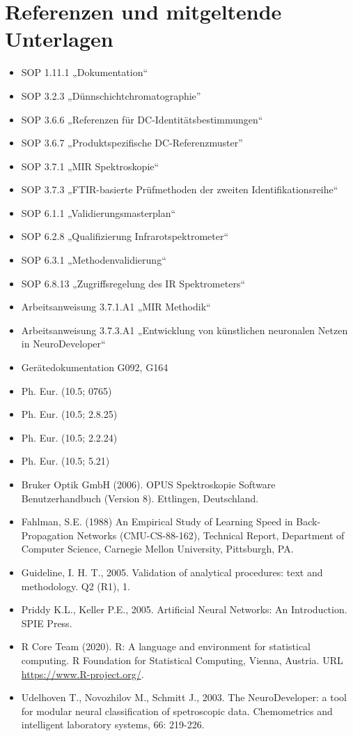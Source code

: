 \documentclass[11pt, a4paper]{article}
\newcommand\VersionPhEur{10.5}
\begin{document}
\section{Referenzen und mitgeltende Unterlagen}
\begin{itemize}
\item SOP 1.11.1 „Dokumentation“
\item SOP 3.2.3 „Dünnschichtchromatographie”
\item SOP 3.6.6 „Referenzen für DC-Identitätsbestimmungen“
\item SOP 3.6.7 „Produktspezifische DC-Referenzmuster”
\item SOP 3.7.1 „MIR Spektroskopie“
\item SOP 3.7.3 „FTIR-basierte Prüfmethoden der zweiten Identifikationsreihe“
\item SOP 6.1.1 „Validierungsmasterplan“
\item SOP 6.2.8 „Qualifizierung Infrarotspektrometer“
\item SOP 6.3.1 „Methodenvalidierung“
\item SOP 6.8.13 „Zugriffsregelung des IR Spektrometers“
\item Arbeitsanweisung 3.7.1.A1 „MIR Methodik“
\item Arbeitsanweisung 3.7.3.A1 „Entwicklung von künstlichen neuronalen Netzen in NeuroDeveloper“
\item Gerätedokumentation G092, G164
\item Ph. Eur. (\VersionPhEur; 0765)
\item Ph. Eur. (\VersionPhEur; 2.8.25)
\item Ph. Eur. (\VersionPhEur; 2.2.24)
\item Ph. Eur. (\VersionPhEur; 5.21)
\item Bruker Optik GmbH (2006). OPUS Spektroskopie Software Benutzerhandbuch (Version 8). Ettlingen, Deutschland.
\item Fahlman, S.E. (1988) An Empirical Study of Learning Speed in Back-Propagation Networks (CMU-CS-88-162), Technical Report, Department of Computer Science, Carnegie Mellon University, Pittsburgh, PA.
\item Guideline, I. H. T., 2005. Validation of analytical procedures: text and methodology. Q2 (R1), 1.
\item Priddy K.L., Keller P.E., 2005. Artificial Neural Networks: An Introduction. SPIE Press.
\item R Core Team (2020). R: A language and environment for statistical computing. R Foundation for Statistical Computing, Vienna, Austria. URL \href{https://www.R-project.org/}{https://www.R-project.org/}.
\item Udelhoven T., Novozhilov M., Schmitt J., 2003. The NeuroDeveloper\textsuperscript{\textregistered}: a tool for modular neural classification of spetroscopic data. Chemometrics and intelligent laboratory systems, 66: 219-226.

\end{itemize}
\end{document}
